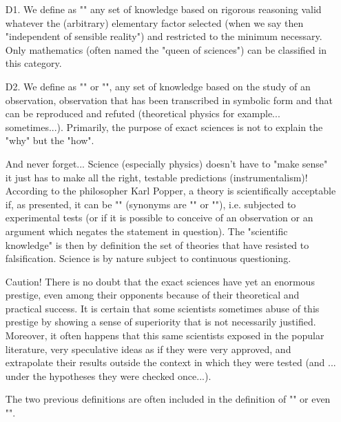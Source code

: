 \begin{itemize}
	\item[D1.] We define as "" any set of knowledge based on rigorous reasoning valid whatever the (arbitrary) elementary factor selected (when we say then "independent of sensible reality") and restricted to the minimum necessary. Only mathematics (often named the "queen of sciences") can be classified in this category. 

	\item[D2.] We define as "" or "", any set of knowledge based on the study of an observation, observation that has been transcribed in symbolic form  and that can be reproduced and refuted (theoretical physics for example... sometimes...). Primarily, the purpose of exact sciences is not to explain the "why" but the "how". 
	
	And never forget... Science (especially physics) doesn't have to "make sense" it just has to make all the right, testable predictions (instrumentalism)! According to the philosopher Karl Popper, a theory is scientifically acceptable if, as presented, it can be "" (synonyms are "" or ""), i.e. subjected to experimental tests (or  if it is possible to conceive of an observation or an argument which negates the statement in question). The "scientific knowledge" is then by definition the set of theories that have resisted to falsification. Science is by nature subject to continuous questioning. 

	Caution! There is no doubt that the exact sciences have yet an enormous prestige, even among their opponents because of their theoretical and practical success. It is certain that some scientists sometimes abuse of this prestige by showing a sense of superiority that is not necessarily justified. Moreover, it often happens that this same scientists exposed in the popular literature, very speculative ideas as if they were very approved, and extrapolate their results outside the context in which they were tested (and ... under the hypotheses they were checked once...). 

	\begin{tcolorbox}[title=Remark,colframe=black,arc=10pt]
The two previous definitions are often included in the definition of "" or even "".
	\end{tcolorbox}
	

\end{itemize}
